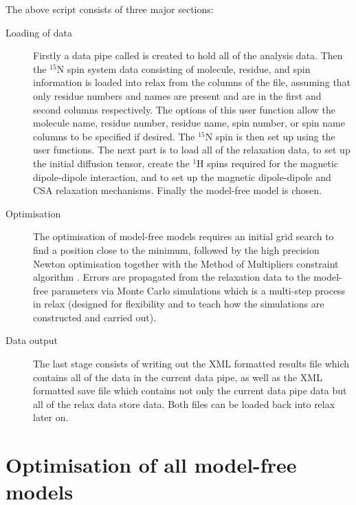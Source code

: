 \begin{htmlonly}
\begin{htmlonly}
The above script consists of three major sections:
\begin{description}
  \item[Loading of data] Firstly a data pipe called  is created to hold all of the analysis data.
    Then the $^{15}$N spin system data consisting of molecule, residue, and spin information is loaded into relax from the columns of the  file, assuming that only residue numbers and names are present and are in the first and second columns respectively.
    The options of this  user function allow the molecule name, residue number, residue name, spin number, or spin name columns to be specified if desired.
    The $^{15}$N spin is then set up using the  user functions.
    The next part is to load all of the relaxation data, to set up the initial diffusion tensor, create the $^1$H spins required for the magnetic dipole-dipole interaction, and to set up the magnetic dipole-dipole and CSA relaxation mechanisms.
    Finally the model-free model  is chosen.
  \item[Optimisation] The optimisation of model-free models requires an initial grid search to find a position close to the minimum, followed by the high precision Newton optimisation together with the Method of Multipliers constraint algorithm \citep{dAuvergneGooley08a}.
    Errors are propagated from the relaxation data to the model-free parameters via Monte Carlo simulations which is a multi-step process in relax (designed for flexibility and to teach how the simulations are constructed and carried out).
  \item[Data output] The last stage consists of writing out the XML formatted results file which contains all of the data in the current data pipe, as well as the XML formatted save file which contains not only the current data pipe data but all of the relax data store data.
    Both files can be loaded back into relax later on.
\end{description}




\section{Optimisation of all model-free models}




\end{htmlonly}
\end{htmlonly}
